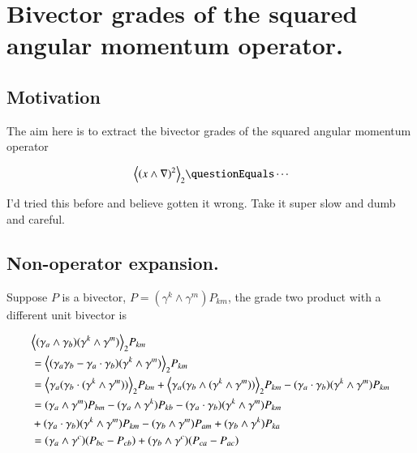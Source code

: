%

\chapter{Bivector grades of the squared angular momentum operator.}
\label{chap:bivectorSelect}
{}
\date{Sept 6, 2009}

\beginArtNoToc

\section{Motivation}

The aim here is to extract the bivector grades of the squared angular momentum operator

\begin{align}\label{eqn:bivectorSelect:goo1}
\gpgradetwo{ (x \wedge \grad)^2 } \questionEquals \cdots
\end{align}

I'd tried this before and believe gotten it wrong.  Take it super slow and dumb and careful.

\section{Non-operator expansion.}

Suppose $P$ is a bivector, $P = (\gamma^k \wedge \gamma^m) P_{km}$, the grade two product with a different unit bivector is

\begin{align*}
&{\left\langle{{ (\gamma_a \wedge \gamma_b) (\gamma^k \wedge \gamma^m) }}\right\rangle}_{2} P_{km} \\
&= 
{\left\langle{{ (\gamma_a \gamma_b - \gamma_a \cdot \gamma_b) (\gamma^k \wedge \gamma^m) }}\right\rangle}_{2} P_{km} \\
&= 
{\left\langle{{ \gamma_a (\gamma_b \cdot (\gamma^k \wedge \gamma^m)) }}\right\rangle}_{2} P_{km} 
+ {\left\langle{{ \gamma_a (\gamma_b \wedge (\gamma^k \wedge \gamma^m)) }}\right\rangle}_{2} P_{km} 
- (\gamma_a \cdot \gamma_b) (\gamma^k \wedge \gamma^m) P_{km} \\
&= 
(\gamma_a \wedge \gamma^m) P_{b m} -(\gamma_a \wedge \gamma^k) P_{k b} - (\gamma_a \cdot \gamma_b) (\gamma^k \wedge \gamma^m) P_{km} \\
&+ (\gamma_a \cdot \gamma_b) (\gamma^k \wedge \gamma^m) P_{km} 
- (\gamma_b \wedge \gamma^m) P_{a m} 
+ (\gamma_b \wedge \gamma^k) P_{k a} 
\\
&= 
(\gamma_a \wedge \gamma^c) (P_{b c} -P_{c b})
+ (\gamma_b \wedge \gamma^c) (P_{c a} -P_{a c} )
\\
\end{align*}

